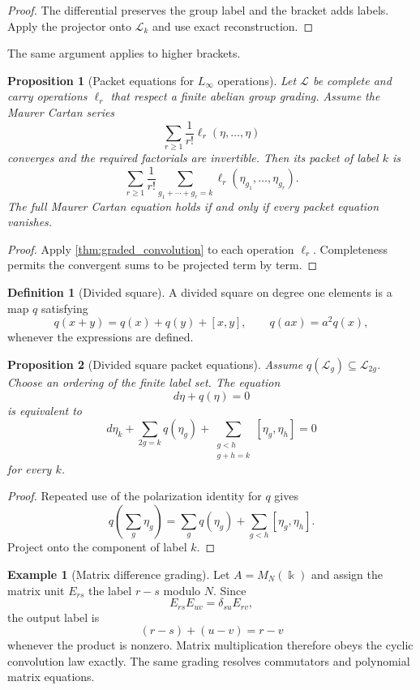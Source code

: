 \documentclass{aomart}
\newtheorem{proposition}[proposition]{Proposition}
\theoremstyle{definition}
\newtheorem{definition}[definition]{Definition}
\newtheorem{example}[example]{Example}
\theoremstyle{remark}
\newcommand{\bbk}{\Bbbk}
\newcommand{\Lcal}{\mathcal L}
\begin{document}
\begin{proof}
The differential preserves the group label and the bracket adds labels.  Apply the projector onto $\Lcal_k$ and use exact reconstruction.
\end{proof}

The same argument applies to higher brackets.

\begin{proposition}[Packet equations for $L_\infty$ operations]\label{prop:packet_l_infinity}
Let $\Lcal$ be complete and carry operations $\ell_r$ that respect a finite abelian group grading.  Assume the Maurer Cartan series
\[
\sum_{r\ge1}\frac1{r!}\ell_r(\eta,\ldots,\eta)
\]
converges and the required factorials are invertible.  Then its packet of label $k$ is
\[
\sum_{r\ge1}\frac1{r!}
\sum_{g_1+\cdots+g_r=k}
\ell_r(\eta_{g_1},\ldots,\eta_{g_r}).
\]
The full Maurer Cartan equation holds if and only if every packet equation vanishes.
\end{proposition}

\begin{proof}
Apply \cref{thm:graded_convolution} to each operation $\ell_r$.  Completeness permits the convergent sums to be projected term by term.
\end{proof}

\begin{definition}[Divided square]\label{def:divided_square}
A divided square on degree one elements is a map $q$ satisfying
\[
q(x+y)=q(x)+q(y)+[x,y],
\qquad
q(ax)=a^2q(x),
\]
whenever the expressions are defined.
\end{definition}

\begin{proposition}[Divided square packet equations]\label{prop:divided_square_packets}
Assume $q(\Lcal_g)\subseteq\Lcal_{2g}$.  Choose an ordering of the finite label set.  The equation
\[
d\eta+q(\eta)=0
\]
is equivalent to
\[
d\eta_k
+
\sum_{2g=k}q(\eta_g)
+
\sum_{\substack{g<h\\g+h=k}}[\eta_g,\eta_h]
=0
\]
for every $k$.
\end{proposition}

\begin{proof}
Repeated use of the polarization identity for $q$ gives
\[
q\left(\sum_g\eta_g\right)
=
\sum_gq(\eta_g)
+
\sum_{g<h}[\eta_g,\eta_h].
\]
Project onto the component of label $k$.
\end{proof}


\begin{example}[Matrix difference grading]\label{ex:matrix_difference_grading}
Let $A=M_N(\bbk)$ and assign the matrix unit $E_{rs}$ the label $r-s$ modulo $N$.  Since
\[
E_{rs}E_{uv}=\delta_{su}E_{rv},
\]
the output label is
\[
(r-s)+(u-v)=r-v
\]
whenever the product is nonzero.  Matrix multiplication therefore obeys the cyclic convolution law exactly.  The same grading resolves commutators and polynomial matrix equations.
\end{example}
\end{document}
